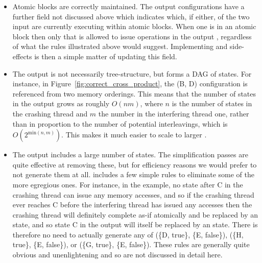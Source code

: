 \begin{itemize}
\item
  Atomic blocks are correctly maintained.  The output {\StateMachine}
  configurations have a further field not discussed above which
  indicates which, if either, of the two input {\StateMachines} are
  currently executing within atomic blocks.  When one {\StateMachine}
  is in an atomic block then only that {\StateMachine} is allowed to
  issue operations in the output {\StateMachine}, regardless of what
  the rules illustrated above would suggest.  Implementing
  {\stStartAtomic} and {\stEndAtomic} side-effects is then a
  simple matter of updating this field.

\item The output {\StateMachine} is not necessarily tree-structure,
  but forms a DAG of states.  For instance, in
  Figure~\ref{fig:correct_cross_product}, the (B, D) configuration is
  referenced from two memory orderings.  This means that the number of
  states in the output {\StateMachine} grows as roughly $O(nm)$, where
  $n$ is the number of states in the crashing thread {\StateMachine}
  and $m$ the number in the interfering thread one, rather than in
  proportion to the number of potential interleavings, which is
  $O(2^{\mathrm{min}(n,m)})$.  This makes it much easier to scale
  {\technique} to larger {\StateMachines}.

\item The output {\StateMachine} includes a large number of
  {\stUnreached} states.  The {\StateMachine} simplification passes
  are quite effective at removing these, but for efficiency reasons we
  would prefer to not generate them at all.  {\Implementation}
  includes a few simple rules to eliminate some of the more egregious
  ones.  For instance, in the example, no state after C in the
  crashing thread {\StateMachine} can issue any memory accesses, and
  so if the crashing thread ever reaches C before the interfering
  thread has issued any accesses then the crashing thread will
  definitely complete as-if atomically and be replaced by an
  {\stUnreached} state, and so state C in the output
        {\StateMachine} will itself be replaced by an
        {\stUnreached} state.  There is therefore no need to
        actually generate any of (\{D, true\}, \{E, false\}), (\{H,
        true\}, \{E, false\}), or (\{G, true\}, \{E, false\}).  These
        rules are generally quite obvious and unenlightening and so
        are not discussed in detail here.
\end{itemize}

